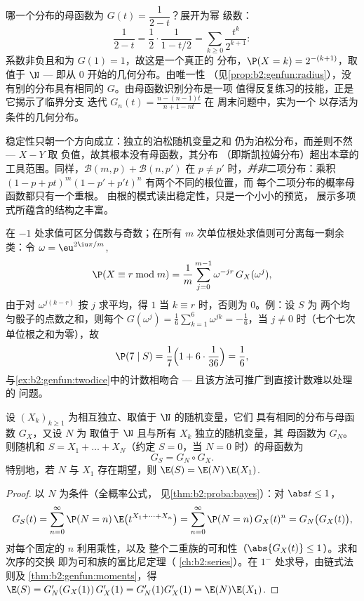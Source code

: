\begin{example}[由母函数读出
分布]\label{ex:b2:genfun:identify}
哪一个分布的母函数为 $G(t) = \dfrac1{2 - t}$？展开为幂
级数：
\[
\frac{1}{2 - t} = \frac12\cdot\frac1{1 - t/2}
= \sum_{k\geq0}\frac{t^k}{2^{k+1}} :
\]
系数非负且和为 $G(1) = 1$，故这是一个真正的
分布，$\P(X = k) = 2^{-(k+1)}$，取值于 $\N$ ---
即从 $0$ 开始的几何分布。由唯一性
（见\cref{prop:b2:genfun:radius}），没有别的分布具有相同的
$G$。由母函数识别分布是一项
值得反复练习的技能，正是它揭示了临界分支
迭代 $G_n(t) = \frac{n - (n-1)t}{n+1 - nt}$ 在
周末问题中，实为一个
以存活为条件的几何分布。
\end{example}

\begin{remark}
稳定性只朝一个方向成立：独立的泊松随机变量之和
仍为泊松分布，而差则不然 --- $X - Y$ 取
负值，故其根本没有母函数，其分布
（即斯凯拉姆分布）超出本章的
工具范围。同样，$\mathcal B(m, p) + \mathcal B(n, p')$ 在
$p \neq p'$ 时，\emph{并非}二项分布：乘积 $(1 - p +
pt)^m(1 - p' + p't)^n$ 有两个不同的根位置，而
每个二项分布的概率母函数都只有一个重根。
由根的模式读出稳定性，只是一个小小的预览，
展示多项式所蕴含的结构之丰富。
\end{remark}

\begin{remark}[单位根滤波]
在 $-1$ 处求值可区分偶数与奇数；在所有
$m$ 次单位根处求值则可分离每一剩余类：令
$\omega = \eu^{2\iu\pi/m}$,
\[
\P(X \equiv r \bmod m)
= \frac1m\sum_{j=0}^{m-1}\omega^{-jr}\,G_X(\omega^j),
\]
由于对 $\omega^{j(k-r)}$ 按 $j$ 求平均，得 $1$ 当 $k
\equiv r$ 时，否则为 $0$。例：设 $S$ 为
两个均匀骰子的点数之和，则每个 $G(\omega^j) = \frac16\sum_{k=1}^6
\omega^{jk} = -\frac16$，当 $j \neq 0$ 时（七个七次
单位根之和为零），故
\[
\P(7 \mid S) = \frac17\Bigl(1 +
6\cdot\frac1{36}\Bigr) = \frac16 ,
\]
与\cref{ex:b2:genfun:twodice}中的计数相吻合 ---
且该方法可推广到直接计数难以处理的
问题。
\end{remark}

\begin{theorem}\label{thm:b2:genfun:compound}
设 $(X_k)_{k\geq1}$ 为相互独立、取值于 $\N$ 的随机变量，它们
具有相同的分布与母函数 $G_X$，又设 $N$ 为
取值于 $\N$ 且与所有 $X_k$ 独立的随机变量，其
母函数为 $G_N$。则随机和 $S = X_1 + \dots + X_N$（约定
$S = 0$，当 $N = 0$ 时）的母函数为
\[
G_S = G_N \circ G_X .
\]
特别地，若 $N$ 与 $X_1$ 存在期望，则 $\E(S) =
\E(N)\,\E(X_1)$.
\end{theorem}

\begin{proof}
以 $N$ 为条件（全概率公式，
见\cref{thm:b2:proba:bayes}）：对 $\abs t \leq 1$，
\[
G_S(t) = \sum_{n=0}^\infty \P(N = n)\,
\E\bigl(t^{X_1 + \dots + X_n}\bigr)
= \sum_{n=0}^\infty \P(N = n)\,G_X(t)^n
= G_N\bigl(G_X(t)\bigr),
\]
对每个固定的 $n$ 利用乘性，以及
整个二重族的可和性（$\abs{G_X(t)} \leq 1$）。求和次序的交换
即为可和族的富比尼定理（
\cref{ch:b2:series}）。在 $1^-$ 处求导，由链式法则及
\cref{thm:b2:genfun:moments}，得 $\E(S) = G_N'(G_X(1))\,G_X'(1)
= G_N'(1)G_X'(1) = \E(N)\E(X_1)$.
\end{proof}

